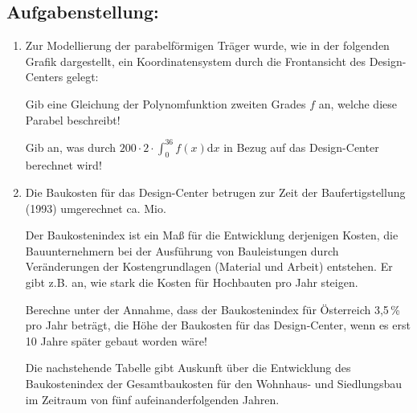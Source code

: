 \begin{langesbeispiel}
\subsection{Aufgabenstellung:}
\begin{enumerate}
	\item Zur Modellierung der parabelförmigen Träger wurde, wie in der folgenden Grafik dargestellt, ein Koordinatensystem durch die Frontansicht des Design-Centers gelegt:
	
	\begin{center}
	\end{center}
	
	 Gib eine Gleichung der Polynomfunktion zweiten Grades $f$ an, welche diese Parabel beschreibt!
	
	Gib an, was durch $200\cdot 2\cdot \int^{36}_0{f(x)}$d$x$ in Bezug auf das Design-Center berechnet wird!\leer
	
\item Die Baukosten für das Design-Center betrugen zur Zeit der Baufertigstellung (1993) umgerechnet ca.  Mio.  

Der Baukostenindex ist ein Maß für die Entwicklung derjenigen Kosten, die Bauunternehmern bei der Ausführung von Bauleistungen durch Veränderungen der Kostengrundlagen (Material und Arbeit) entstehen. Er gibt z.B. an, wie stark die Kosten für Hochbauten pro Jahr steigen. 

Berechne unter der Annahme, dass der Baukostenindex für Österreich 3,5\,\% pro Jahr beträgt, die Höhe der Baukosten für das Design-Center, wenn es erst 10 Jahre später gebaut worden wäre!

Die nachstehende Tabelle gibt Auskunft über die Entwicklung des Baukostenindex der Gesamtbaukosten für den Wohnhaus- und Siedlungsbau im Zeitraum von fünf aufeinanderfolgenden Jahren.


\end{enumerate}
\end{langesbeispiel}
